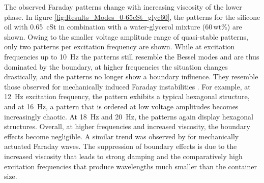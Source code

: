 \documentclass{jfm_arxiv}
\begin{document}
The observed Faraday patterns change with increasing viscosity of the lower phase. In figure  \ref{fig:Results_Modes_0-65cSt_glyc60}, the patterns for the silicone oil with \SI{0.65}{\centi St} in combination with a water-glycerol mixture (\mbox{60\,wt\%}) are shown.
Owing to the smaller voltage amplitude range of quasi-stable patterns, only two patterns per excitation frequency are shown.
While at excitation frequencies up to \SI{10}{\hertz} the patterns still resemble the Bessel modes and are thus dominated by the boundary, at higher frequencies the situation changes drastically, and the patterns no longer show a boundary influence.
They resemble those observed for mechanically induced Faraday instabilities \citep{Edwards1994}.
For example, at \SI{12}{\hertz} excitation frequency, the pattern exhibits a typical hexagonal structure, and at \SI{16}{\hertz}, a pattern that is ordered at low voltage amplitudes becomes increasingly chaotic.
At \SI{18}{\hertz} and \SI{20}{\hertz}, the patterns again display hexagonal structures. 
Overall, at higher frequencies and increased viscosity, the boundary effects become negligible. A similar trend was observed by \citet{Edwards1994} for mechanically actuated Faraday waves. The suppression of boundary effects is due to the increased viscosity that leads to strong damping and the comparatively high excitation frequencies that produce wavelengths much smaller than the container size.
\end{document}
